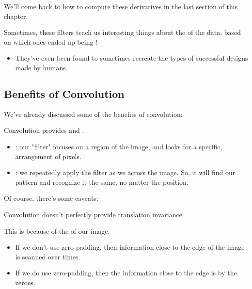         We'll come back to how to compute these derivatives in the last section of this chapter.

        Sometimes, these filters teach us interesting things about the  of the data, based on which ones ended up being !

        \begin{itemize}
            \item They've even been found to sometimes recreate the types of successful designs made by humans.
        \end{itemize}

        \subsection{Benefits of Convolution}

        We've already discussed some of the benefits of convolution:\\

        \begin{concept}
            Convolution provides  and .

            \begin{itemize}
                \item {}: our "filter" focuses on a  region of the image, and looks for a specific,  arrangement of pixels.
                \item {}: we repeatedly apply the  filter as we  across the image. So, it will find our pattern and recognize it the same, no matter the position.
            \end{itemize}
        \end{concept}

        Of course, there's some caveats:\\

        \begin{clarification}
            Convolution doesn't perfectly provide translation invariance.

            This is because of the  of our image. 
            \begin{itemize}
                \item If we don't use zero-padding, then information close to the edge of the image is scanned over  times.
                \item If we do use zero-padding, then the information close to the edge is  by the zeroes.
            \end{itemize}
        \end{clarification}

